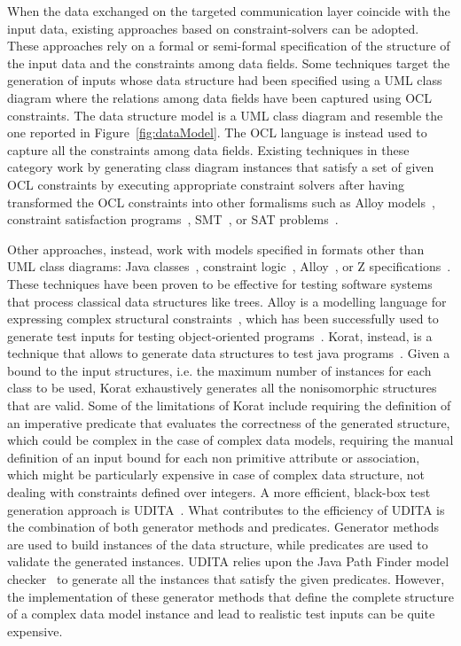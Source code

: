 When the data exchanged on the targeted communication layer coincide with the input data, existing approaches based on constraint-solvers can be adopted. 
These approaches rely on a formal or semi-formal specification of the structure of the input data and the constraints among data fields.
Some techniques target the generation of inputs whose data structure had been specified using a UML class diagram where the relations among data fields have been captured using OCL constraints. The data structure model is a UML class diagram and resemble the one reported in Figure~\ref{fig:dataModel}. The OCL language is instead used to capture all the constraints among data fields. Existing techniques in these category work by generating class diagram instances that satisfy a set of given OCL constraints by executing appropriate constraint solvers after having transformed the OCL constraints into other formalisms such as Alloy models~\cite{Uml2alloy}, constraint satisfaction programs~\cite{EMFTOCSP}, SMT~\cite{Przigoda2016}, or SAT problems~\cite{Soeken2011}. 

Other approaches, instead, work with models specified in formats other than UML class diagrams:
Java classes~\cite{Boyapati-KORAT-ISSTA-2002,gligoric2010test}, constraint logic~\cite{Senni-CPLgeneration-TAP-2012}, Alloy~\cite{Khurshid-SpecificationBasedTesting-ASE-2004}, or Z specifications~\cite{Horcher-Z-1995}.
These techniques have been proven to be effective for testing software systems that process classical data structures like trees. 
Alloy is a modelling language for expressing complex structural constraints~\cite{Jackson:Alloy:2002},
which has been successfully used to generate test inputs for testing object-oriented programs~\cite{Khurshid-SpecificationBasedTesting-ASE-2004}.
Korat, instead, is a technique that allows to generate data structures to test java programs~\cite{Boyapati-KORAT-ISSTA-2002}. Given a bound to the input structures, i.e. the maximum number of instances for each class to be used, Korat exhaustively generates all the nonisomorphic structures that are valid. 
Some of the limitations of Korat include requiring the definition of an imperative predicate that evaluates the correctness of the generated structure, which could be complex in the case of complex data models, requiring the manual definition of an input bound for each non primitive attribute or association, which might be particularly expensive in case of complex data structure,  not dealing with constraints defined over integers.
A more efficient, black-box test generation approach is UDITA~\cite{gligoric2010test}.
What contributes to the efficiency of UDITA is the combination of both generator methods and predicates.
Generator methods are used to build instances of the data structure, while predicates are used to validate the generated instances. UDITA relies upon the Java Path Finder model checker~\cite{Visser-JPF-2004} to generate all the instances that satisfy the given predicates. However, the implementation of these generator methods that define the complete structure of a complex data model instance and lead to realistic test inputs can be quite expensive. 

